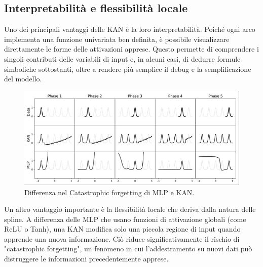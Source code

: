 \documentclass[a4paper,12pt]{report}
\begin{document}
	\subsection{Interpretabilità e flessibilità locale}
	Uno dei principali vantaggi delle KAN è la loro interpretabilità. Poiché ogni arco implementa una funzione univariata ben definita, è possibile visualizzare direttamente le forme delle attivazioni apprese. Questo permette di comprendere i singoli contributi delle variabili di input e, in alcuni casi, di dedurre formule simboliche sottostanti, oltre a rendere più semplice il debug e la semplificazione del modello. \\
	\begin{figure}[H]
		\centering
		\includegraphics[width=1.0\textwidth]{img/Catastrophic_forgetting_KANvsMLP.jpg}
		\caption{Differenza nel Catastrophic forgetting di MLP e KAN.}
	\end{figure}
	Un altro vantaggio importante è la flessibilità locale che deriva dalla natura delle spline. A differenza delle MLP che usano funzioni di attivazione globali (come ReLU o Tanh), una KAN modifica solo una piccola regione di input quando apprende una nuova informazione. Ciò riduce significativamente il rischio di "catastrophic forgetting", un fenomeno in cui l'addestramento su nuovi dati può distruggere le informazioni precedentemente apprese.
	
\end{document}

